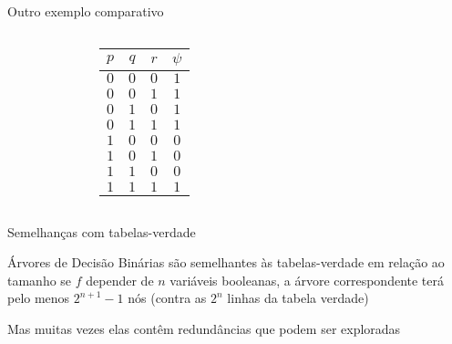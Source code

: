 \expandafter\documentclass\expandafter[table, usenames, svgnames, dvipsnames,14pt, \classopts]{beamer}
\begin{document}
\begin{frame}{Outro exemplo comparativo}
\begin{columns}[c]
\begin{figure}
            \end{figure}

            \begin{center}
                \small
                \begin{table}
                    \begin{tabular}{ccc|c}
                        $p$ & $q$ & $r$ & $\psi$\\
                        \hline
                        $0$ & $0$ & $0$ & $1$\\
                        $0$ & $0$ & $1$ & $1$\\
                        $0$ & $1$ & $0$ & $1$\\
                        $0$ & $1$ & $1$ & $1$\\
                        $1$ & $0$ & $0$ & $0$\\
                        $1$ & $0$ & $1$ & $0$\\
                        $1$ & $1$ & $0$ & $0$\\
                        $1$ & $1$ & $1$ & $1$\\
                    \end{tabular}
                \end{table}
            \end{center}
    
    \end{columns}
    
\end{frame}

\begin{frame}{Semelhanças com tabelas-verdade}

    \begin{outline}
        \1 Árvores de Decisão Binárias são semelhantes às tabelas-verdade em relação ao tamanho
            \2[-] se $f$ depender de $n$ variáveis booleanas, a árvore correspondente terá pelo menos $2^{n+1}-1$ nós (contra as $2^n$ linhas da tabela verdade)
        
        \vspace{1em}
        
        \1 Mas muitas vezes elas contêm redundâncias que podem ser exploradas
    \end{outline}      
   
\end{frame}
\end{document}
